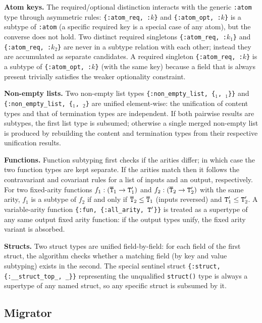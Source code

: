 \medskip
\noindent\textbf{Atom keys.}
The required/optional distinction interacts with the generic \texttt{:atom} type through asymmetric rules:
\texttt{\{:atom\_req, :$k$\}} and \texttt{\{:atom\_opt, :$k$\}} is a subtype of \texttt{:atom} (a specific required key is a special case of any atom), but the converse does not hold.
Two distinct required singletons \texttt{\{:atom\_req, :$k_1$\}} and \texttt{\{:atom\_req, :$k_2$\}} are never in a subtype relation with each other; instead they are accumulated as separate candidates.
A required singleton \texttt{\{:atom\_req, :$k$\}} is a subtype of \texttt{\{:atom\_opt, :$k$\}} (with the same key) because a field that is always present trivially satisfies the weaker optionality constraint.

\medskip
\noindent\textbf{Non-empty lists.}
Two non-empty list types \texttt{\{:non\_empty\_list, \{\ETT$_1$, \ETT$_1$\}\}} and \texttt{\{:non\_empty\_list, \{\ETT$_1$, \ETT$_2$\}} are unified element-wise: the unification of content types and that of termination types are independent.
If both pairwise results are subtypes, the first list type is subsumed; otherwise a single merged non-empty list is produced by rebuilding the content and termination types from their respective unification results.

\medskip
\noindent\textbf{Functions.}
Function subtyping first checks if the arities differ; in which case the two function types are kept separate.
If the arities match then it follows the contravariant and covariant rules for a list of inputs and an output, respectively.
For two fixed-arity functions $f_1 : (\overline{\texttt{T}}_1 \to \texttt{T}_1^{\prime})$ and $f_2 : (\overline{\texttt{T}}_2 \to \texttt{T}_2^{\prime})$ with the same arity, $f_1$ is a subtype of $f_2$ if and only if $\overline{\texttt{T}}_2 \leq \overline{\texttt{T}}_1$ (inputs reversed) and $\texttt{T}_1^{\prime} \leq \texttt{T}_2^{\prime}$.
A variable-arity function \texttt{\{:fun, \{:all\_arity, $\texttt{T}^{\prime}$\}\}} is treated as a supertype of any same output fixed arity function: if the output types unify, the fixed arity variant is absorbed.

\medskip
\noindent\textbf{Structs.}
Two struct types are unified field-by-field: for each field of the first struct, the algorithm checks whether a matching field (by key and value subtyping) exists in the second.
The special sentinel struct \texttt{\{:struct, \{:\_\_struct\_top\_, \_\}\}} representing the unqualified \texttt{struct()} type is always a supertype of any named struct, so any specific struct is subsumed by it.

\subsection{Migrator}

